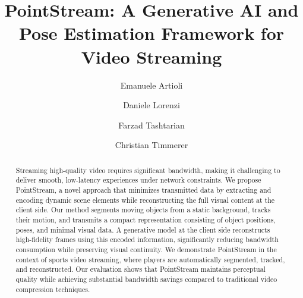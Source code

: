 \documentclass[sigconf, screen, review, anonymous]{acmart}
\begin{document}
\title[PointStream]{PointStream: A Generative AI and Pose Estimation Framework for Video Streaming}

\renewcommand{\shortauthors}{Artioli et al.}

\author{Emanuele Artioli}
\author{Daniele Lorenzi}
\author{Farzad Tashtarian}
\author{Christian Timmerer}

\begin{abstract}
Streaming high-quality video requires significant bandwidth, making it challenging to deliver smooth, low-latency experiences under network constraints. We propose PointStream, a novel approach that minimizes transmitted data by extracting and encoding dynamic scene elements while reconstructing the full visual content at the client side. Our method segments moving objects from a static background, tracks their motion, and transmits a compact representation consisting of object positions, poses, and minimal visual data. A generative model at the client side reconstructs high-fidelity frames using this encoded information, significantly reducing bandwidth consumption while preserving visual continuity. We demonstrate PointStream in the context of sports video streaming, where players are automatically segmented, tracked, and reconstructed. Our evaluation shows that PointStream maintains perceptual quality while achieving substantial bandwidth savings compared to traditional video compression techniques.
\end{abstract}
\end{document}
